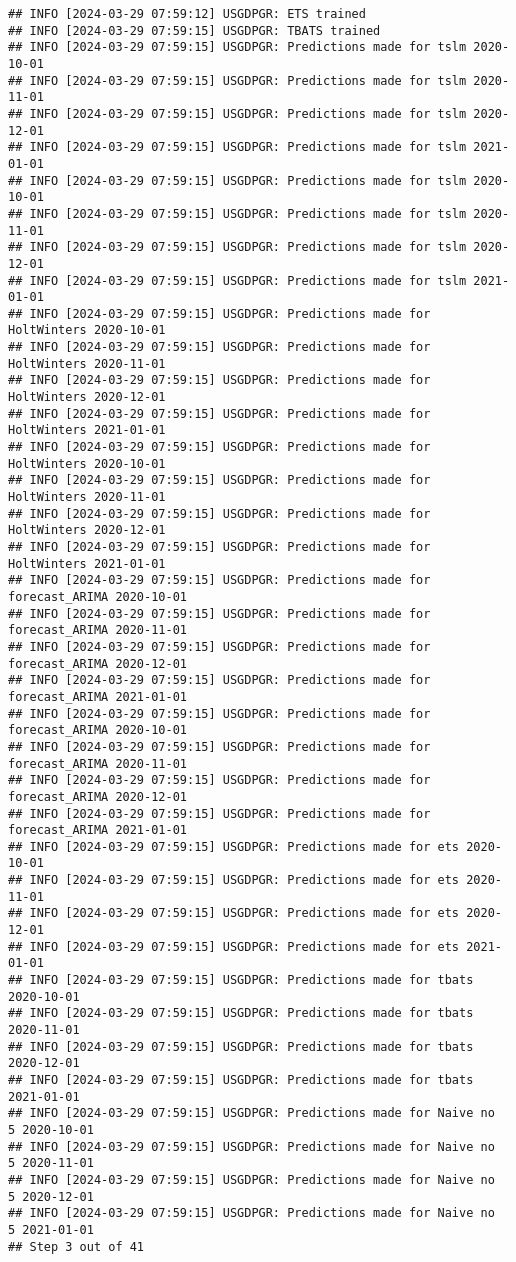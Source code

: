 \documentclass[
]{article}
\begin{document}
\begin{verbatim}
## INFO [2024-03-29 07:59:12] USGDPGR: ETS trained
## INFO [2024-03-29 07:59:15] USGDPGR: TBATS trained
## INFO [2024-03-29 07:59:15] USGDPGR: Predictions made for tslm 2020-10-01
## INFO [2024-03-29 07:59:15] USGDPGR: Predictions made for tslm 2020-11-01
## INFO [2024-03-29 07:59:15] USGDPGR: Predictions made for tslm 2020-12-01
## INFO [2024-03-29 07:59:15] USGDPGR: Predictions made for tslm 2021-01-01
## INFO [2024-03-29 07:59:15] USGDPGR: Predictions made for tslm 2020-10-01
## INFO [2024-03-29 07:59:15] USGDPGR: Predictions made for tslm 2020-11-01
## INFO [2024-03-29 07:59:15] USGDPGR: Predictions made for tslm 2020-12-01
## INFO [2024-03-29 07:59:15] USGDPGR: Predictions made for tslm 2021-01-01
## INFO [2024-03-29 07:59:15] USGDPGR: Predictions made for HoltWinters 2020-10-01
## INFO [2024-03-29 07:59:15] USGDPGR: Predictions made for HoltWinters 2020-11-01
## INFO [2024-03-29 07:59:15] USGDPGR: Predictions made for HoltWinters 2020-12-01
## INFO [2024-03-29 07:59:15] USGDPGR: Predictions made for HoltWinters 2021-01-01
## INFO [2024-03-29 07:59:15] USGDPGR: Predictions made for HoltWinters 2020-10-01
## INFO [2024-03-29 07:59:15] USGDPGR: Predictions made for HoltWinters 2020-11-01
## INFO [2024-03-29 07:59:15] USGDPGR: Predictions made for HoltWinters 2020-12-01
## INFO [2024-03-29 07:59:15] USGDPGR: Predictions made for HoltWinters 2021-01-01
## INFO [2024-03-29 07:59:15] USGDPGR: Predictions made for forecast_ARIMA 2020-10-01
## INFO [2024-03-29 07:59:15] USGDPGR: Predictions made for forecast_ARIMA 2020-11-01
## INFO [2024-03-29 07:59:15] USGDPGR: Predictions made for forecast_ARIMA 2020-12-01
## INFO [2024-03-29 07:59:15] USGDPGR: Predictions made for forecast_ARIMA 2021-01-01
## INFO [2024-03-29 07:59:15] USGDPGR: Predictions made for forecast_ARIMA 2020-10-01
## INFO [2024-03-29 07:59:15] USGDPGR: Predictions made for forecast_ARIMA 2020-11-01
## INFO [2024-03-29 07:59:15] USGDPGR: Predictions made for forecast_ARIMA 2020-12-01
## INFO [2024-03-29 07:59:15] USGDPGR: Predictions made for forecast_ARIMA 2021-01-01
## INFO [2024-03-29 07:59:15] USGDPGR: Predictions made for ets 2020-10-01
## INFO [2024-03-29 07:59:15] USGDPGR: Predictions made for ets 2020-11-01
## INFO [2024-03-29 07:59:15] USGDPGR: Predictions made for ets 2020-12-01
## INFO [2024-03-29 07:59:15] USGDPGR: Predictions made for ets 2021-01-01
## INFO [2024-03-29 07:59:15] USGDPGR: Predictions made for tbats 2020-10-01
## INFO [2024-03-29 07:59:15] USGDPGR: Predictions made for tbats 2020-11-01
## INFO [2024-03-29 07:59:15] USGDPGR: Predictions made for tbats 2020-12-01
## INFO [2024-03-29 07:59:15] USGDPGR: Predictions made for tbats 2021-01-01
## INFO [2024-03-29 07:59:15] USGDPGR: Predictions made for Naive no  5 2020-10-01
## INFO [2024-03-29 07:59:15] USGDPGR: Predictions made for Naive no  5 2020-11-01
## INFO [2024-03-29 07:59:15] USGDPGR: Predictions made for Naive no  5 2020-12-01
## INFO [2024-03-29 07:59:15] USGDPGR: Predictions made for Naive no  5 2021-01-01
## Step 3 out of 41
\end{verbatim}
\end{document}
